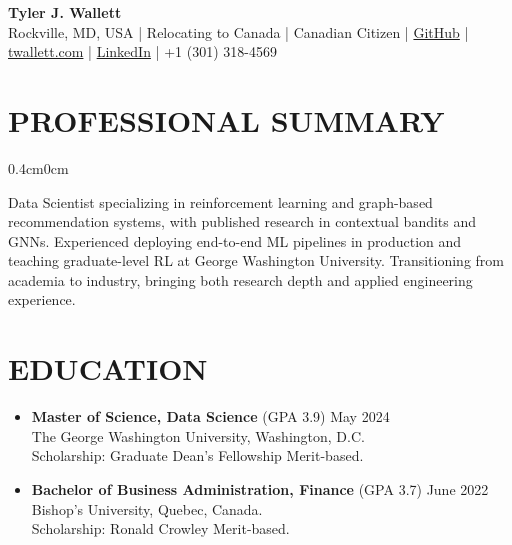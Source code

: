 \documentclass[a4paper,9pt]{extarticle}
\begin{document}
\thispagestyle{firstpage}

\begin{center}
\textbf{\Huge Tyler J. Wallett }\\[3pt] %
Rockville, MD, USA | Relocating to Canada | Canadian Citizen | \href{https://github.com/twallett}{GitHub} | \href{https://www.twallett.com}{twallett.com} | \href{https://www.linkedin.com/in/twallett/}{LinkedIn} | +1 (301) 318-4569  %
\end{center}

\section*{PROFESSIONAL SUMMARY}

\begin{adjustwidth}{0.4cm}{0cm} %

Data Scientist specializing in reinforcement learning and graph-based recommendation systems, with published research in contextual bandits and GNNs. Experienced deploying end-to-end ML pipelines in production and teaching graduate-level RL at George Washington University. Transitioning from academia to industry, bringing both research depth and applied engineering experience.

\end{adjustwidth}


\section*{EDUCATION}

\begin{itemize}[leftmargin=0.4cm, label={}]
    \item \textbf{Master of Science, Data Science} (GPA 3.9) \hfill May 2024 \\ 
    The George Washington University, Washington, D.C. \\ 
    Scholarship: Graduate Dean's Fellowship Merit-based.
\end{itemize}

\noindent
\begin{itemize}[leftmargin=0.4cm, label={}]
    \item \textbf{Bachelor of Business Administration, Finance} (GPA 3.7) \hfill June 2022 \\
    Bishop's University, Quebec, Canada. \\ 
    Scholarship: Ronald Crowley Merit-based.
\end{itemize}
\end{document}
